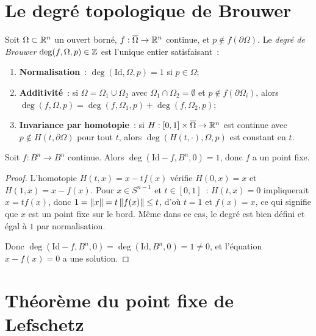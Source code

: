 \section{Le degr\'e topologique de Brouwer}

\begin{definition}
Soit $\Omega \subset \mathbb{R}^n$ un ouvert born\'e, $f : \overline{\Omega} \to \mathbb{R}^n$
continue, et $p \notin f(\partial\Omega)$. Le \emph{degr\'e de Brouwer}
$\deg(f, \Omega, p) \in \mathbb{Z}$ est l'unique entier satisfaisant~:
\begin{enumerate}
    \item \textbf{Normalisation}~: $\deg(\mathrm{Id}, \Omega, p) = 1$ si $p \in \Omega$;
    \item \textbf{Additivit\'e}~: si $\Omega = \Omega_1 \cup \Omega_2$ avec
          $\Omega_1 \cap \Omega_2 = \emptyset$ et $p \notin f(\partial\Omega_i)$,
          alors $\deg(f, \Omega, p) = \deg(f, \Omega_1, p) + \deg(f, \Omega_2, p)$;
    \item \textbf{Invariance par homotopie}~: si $H : [0,1] \times
          \overline{\Omega} \to \mathbb{R}^n$ est continue avec $p \notin H(t, \partial\Omega)$
          pour tout $t$, alors $\deg(H(t, \cdot), \Omega, p)$ est constant en $t$.
\end{enumerate}
\end{definition}

\begin{theoreme}
Soit $f : B^n \to B^n$ continue. Alors $\deg(\mathrm{Id} - f, B^n, 0) = 1$,
donc $f$ a un point fixe.
\end{theoreme}

\begin{proof}
L'homotopie $H(t, x) = x - tf(x)$ v\'erifie $H(0, x) = x$ et
$H(1, x) = x - f(x)$. Pour $x \in S^{n-1}$ et $t \in [0,1]$~:
$H(t, x) = 0$ impliquerait $x = tf(x)$, donc $1 = \left\| x \right\| = t\left\| f(x) \right\| \leq t$,
d'o\`u $t = 1$ et $f(x) = x$, ce qui signifie que $x$ est un point fixe sur
le bord. M\^eme dans ce cas, le degr\'e est bien d\'efini et \'egal \`a $1$ par
normalisation.

Donc $\deg(\mathrm{Id} - f, B^n, 0) = \deg(\mathrm{Id}, B^n, 0) = 1 \neq 0$,
et l'\'equation $x - f(x) = 0$ a une solution.
\end{proof}

\section{Th\'eor\`eme du point fixe de Lefschetz}

